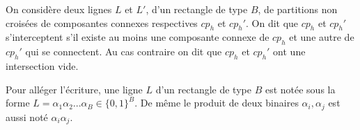 \begin{Def}\label{interfm}
On considère deux lignes $L$ et $L'$, d'un rectangle de type $B$, de partitions non croisées de composantes connexes  respectives $cp_{h}$ et $cp_{h}'$. On dit que $cp_{h}$ et $cp_{h}'$ s'interceptent s'il existe au moins une composante connexe de $cp_{h}$ et une autre de $cp_{h}'$ qui se connectent. Au cas contraire on dit que $cp_{h}$ et $cp_{h}'$ ont une intersection vide.
\end{Def}
Pour alléger l'écriture, une ligne $L$ d'un rectangle de type $B$ est notée  sous la forme $L= \alpha_{1}\alpha_{2}...\alpha_{B}\in \{0,1\}^{B}$. De même le produit de deux binaires $\alpha_{i}, \alpha_{j}$ est  aussi noté $\alpha_{i}\alpha_{j}$.


